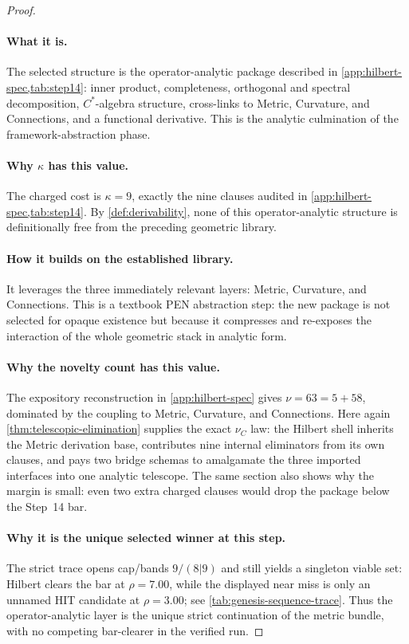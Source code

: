 \documentclass[11pt,a4paper]{article}
\theoremstyle{plain}
\theoremstyle{definition}
\theoremstyle{remark}
\begin{document}
\begin{proof}
\paragraph{What it is.}
The selected structure is the operator-analytic package described in
\cref{app:hilbert-spec,tab:step14}: inner product, completeness, orthogonal and
spectral decomposition, $C^*$-algebra structure, cross-links to Metric,
Curvature, and Connections, and a functional derivative.
This is the analytic culmination of the framework-abstraction phase.

\paragraph{Why $\kappa$ has this value.}
The charged cost is $\kappa=9$, exactly the nine clauses audited in
\cref{app:hilbert-spec,tab:step14}.
By \cref{def:derivability}, none of this operator-analytic structure is
definitionally free from the preceding geometric library.

\paragraph{How it builds on the established library.}
It leverages the three immediately relevant layers: Metric, Curvature, and
Connections.
This is a textbook PEN abstraction step: the new package is not selected for
opaque existence but because it compresses and re-exposes the interaction of the
whole geometric stack in analytic form.

\paragraph{Why the novelty count has this value.}
The expository reconstruction in \cref{app:hilbert-spec} gives
$\nu=63=5+58$, dominated by the coupling to Metric, Curvature, and Connections.
Here again \cref{thm:telescopic-elimination} supplies the exact $\nu_C$ law:
the Hilbert shell inherits the Metric derivation base, contributes nine internal
eliminators from its own clauses, and pays two bridge schemas to amalgamate the
three imported interfaces into one analytic telescope.
The same section also shows why the margin is small: even two extra charged
clauses would drop the package below the Step~14 bar.

\paragraph{Why it is the unique selected winner at this step.}
The strict trace opens cap/bands $9/(8|9)$ and still yields a singleton viable
set: Hilbert clears the bar at $\rho=7.00$, while the displayed near miss is
only an unnamed HIT candidate at $\rho=3.00$; see
\cref{tab:genesis-sequence-trace}.
Thus the operator-analytic layer is the unique strict continuation of the metric
bundle, with no competing bar-clearer in the verified run.
\end{proof}
\end{document}
